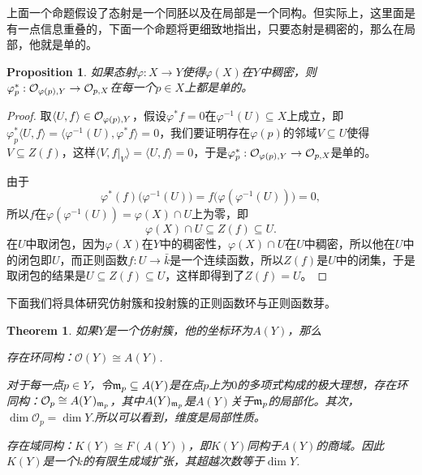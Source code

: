 \documentclass[9pt]{extarticle}
\theoremstyle{plain}%
\newtheorem{pro}[defi]{Proposition}%
\newtheorem{theo}[defi]{Theorem}%
\begin{document}
上面一个命题假设了态射是一个同胚以及在局部是一个同构。但实际上，这里面是有一点信息重叠的，下面一个命题将更细致地指出，只要态射是稠密的，那么在局部，他就是单的。
\begin{pro}
	如果态射$\varphi:X\to Y$使得$\varphi(X)$在$Y$中稠密，则$\varphi^*_p:\mathcal{O}_{\varphi(p),Y}\to \mathcal{O}_{p,X}$在每一个$p\in X$上都是单的。
	\label{c3:p4}
\end{pro}
\begin{proof}
	取$\langle U,f\rangle\in \mathcal{O}_{\varphi(p),Y}$，假设$\varphi^*f=0$在$\varphi^{-1}(U)\subseteq X$上成立，即$\varphi^*_p \langle U,f\rangle=\langle \varphi^{-1}(U),\varphi^*f\rangle=0$，我们要证明存在$\varphi(p)$的邻域$V\subseteq U$使得$V\subseteq Z(f)$，这样$\langle V,f|_V\rangle=\langle U,f\rangle=0$，于是$\varphi^*_p:\mathcal{O}_{\varphi(p),Y}\to \mathcal{O}_{p,X}$是单的。

	由于
	\[
		\varphi^*(f)\bigl(\varphi^{-1}(U)\bigr)=f\bigl(\varphi(\varphi^{-1}(U))\bigr)=0,
	\]
	所以$f$在$\varphi(\varphi^{-1}(U))=\varphi(X)\cap U$上为零，即
	\[
		\varphi(X)\cap U\subseteq Z(f)\subseteq U.
	\]
	在$U$中取闭包，因为$\varphi(X)$在$Y$中的稠密性，$\varphi(X)\cap U$在$U$中稠密，所以他在$U$中的闭包即$U$，而正则函数$f:U\to \bar{k}$是一个连续函数，所以$Z(f)$是$U$中的闭集，于是取闭包的结果是$U\subseteq Z(f) \subseteq U$，这样即得到了$Z(f)=U$。
\end{proof}
下面我们将具体研究仿射簇和投射簇的正则函数环与正则函数芽。
\begin{theo}
	如果$Y$是一个仿射簇，他的坐标环为$A(Y)$，那么

	 存在环同构：$\mathcal{O}(Y)\cong A(Y)$.

	 对于每一点$p\in Y$，令$\mathfrak{m}_p\subseteq A(Y)$是在点$p$上为$0$的多项式构成的极大理想，存在环同构：$\mathcal{O}_p\cong A(Y)_{\mathfrak{m}_p}$，其中$A(Y)_{\mathfrak{m}_p}$是$A(Y)$关于$\mathfrak{m}_p$的局部化。其次，$\dim \mathcal{O}_p=\dim Y$.所以可以看到，维度是局部性质。

	 存在域同构：$K(Y)\cong F(A(Y))$，即$K(Y)$同构于$A(Y)$的商域。因此$K(Y)$是一个$k$的有限生成域扩张，其超越次数等于$\dim Y$.
	\label{c3:t12}
\end{theo}
\end{document}
